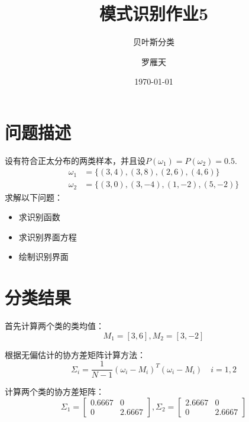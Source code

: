 \documentclass[cn]{elegantbook}
\title{模式识别作业5}
\subtitle{贝叶斯分类}
\author{罗雁天}
\institute{清华大学电子系}
\date{\today}
\begin{document}
\maketitle
\tableofcontents
\mainmatter
\hypersetup{pageanchor=true}
\chapter{问题描述}
设有符合正太分布的两类样本，并且设$P(\omega_1)=P(\omega_2)=0.5$.
\begin{equation}
\begin{aligned}
\omega_1&=\{(3,4),(3,8),(2,6),(4,6)\} \\
\omega_2&=\{(3,0),(3,-4),(1,-2),(5,-2)\}
\end{aligned}
\end{equation}
求解以下问题：
\begin{itemize}
	\item 求识别函数
	\item 求识别界面方程
	\item 绘制识别界面
\end{itemize}

\chapter{分类结果}
首先计算两个类的类均值：
\begin{equation}
M_1=[3,6], M_2=[3,-2]
\end{equation}

根据无偏估计的协方差矩阵计算方法：
\begin{equation}
\Sigma_i=\frac{1}{N-1}\left(\omega_i-M_i\right)^T\left(\omega_i-M_i\right)\quad i=1,2
\end{equation}

计算两个类的协方差矩阵：
\begin{equation}
\Sigma_1=\left[\begin{array}{cc}
0.6667 & 0\\
0 & 2.6667
\end{array}\right],\Sigma_2=\left[\begin{array}{cc}
2.6667 & 0 \\
0 & 2.6667
\end{array}\right]
\end{equation}
\end{document}
